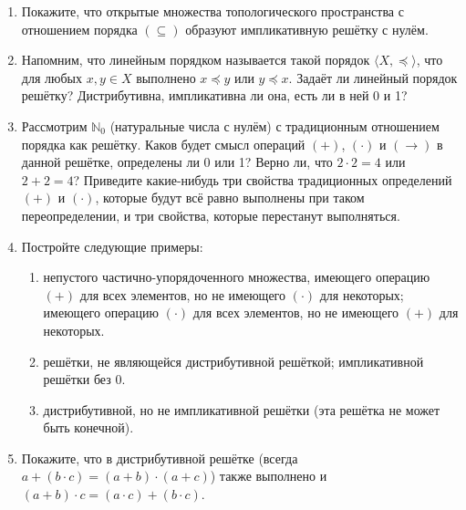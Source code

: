 \documentclass[10pt,a4paper,oneside]{article}
\begin{document}
\begin{enumerate}
\item Покажите, что открытые множества топологического пространства с отношением порядка $(\subseteq)$ 
образуют импликативную решётку с нулём.

\item Напомним, что линейным порядком называется такой порядок $\langle X, \preceq \rangle$, что 
для любых $x,y \in X$ выполнено $x \preceq y$ или $y \preceq x$. Задаёт ли линейный порядок решётку?
Дистрибутивна, импликативна ли она, есть ли в ней 0 и 1?

\item Рассмотрим $\mathbb{N}_0$ (натуральные числа с нулём) с традиционным отношением порядка как решётку.
Каков будет смысл операций $(+)$, $(\cdot)$ и $(\rightarrow)$ в данной решётке, определены ли 0 или 1? 
Верно ли, что $2 \cdot 2 = 4$ или $2 + 2 = 4$? Приведите какие-нибудь три свойства традиционных определений 
$(+)$ и $(\cdot)$, которые будут всё равно выполнены при таком переопределении, и три свойства, которые 
перестанут выполняться.

\item Постройте следующие примеры:
\begin{enumerate}
\item непустого частично-упорядоченного множества, имеющего операцию $(+)$ для всех элементов, но не имеющего $(\cdot)$ для некоторых;
имеющего операцию $(\cdot)$ для всех элементов, но не имеющего $(+)$ для некоторых.
\item решётки, не являющейся дистрибутивной решёткой; импликативной решётки без 0.
\item дистрибутивной, но не импликативной решётки (эта решётка не может быть конечной).
\end{enumerate}

\item Покажите, что в дистрибутивной решётке (всегда $a + (b \cdot c) = (a + b) \cdot (a + c)$) также выполнено
и $(a + b)\cdot c = (a \cdot c) + (b \cdot c)$.


\end{enumerate}
\end{document}
